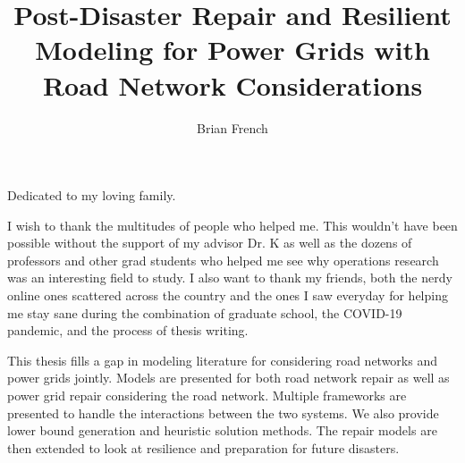 \documentclass[12pt]{report}	%
\author{Brian French}  	%
\title{Post-Disaster Repair and Resilient Modeling for Power Grids with Road Network Considerations}
\theoremstyle{definition}
\theoremstyle{remark}
\begin{document}
	
	\copyrightpage          %
	
	
	\commcertpage           %
	
	\titlepage              %
	
	
	
	\begin{dedication}
		Dedicated to my loving family.
	\end{dedication}
	
	
	\begin{acknowledgments}		%
		I wish to thank the multitudes of people who helped me. This wouldn't have been possible without the support of my advisor Dr. K as well as the dozens of professors and other grad students who helped me see why operations research was an interesting field to study. I also want to thank my friends, both the nerdy online ones scattered across the country and the ones I saw everyday for helping me stay sane during the combination of graduate school, the COVID-19 pandemic, and the process of thesis writing.
	\end{acknowledgments}
	
	
	\utabstract
	\indent
This thesis fills a gap in modeling literature for considering road networks and power grids jointly. Models are presented for both road network repair as well as power grid repair considering the road network. Multiple frameworks are presented to handle the interactions between the two systems. We also provide lower bound generation and heuristic solution methods. The repair models are then extended to look at resilience and preparation for future disasters.
	
\end{document}
